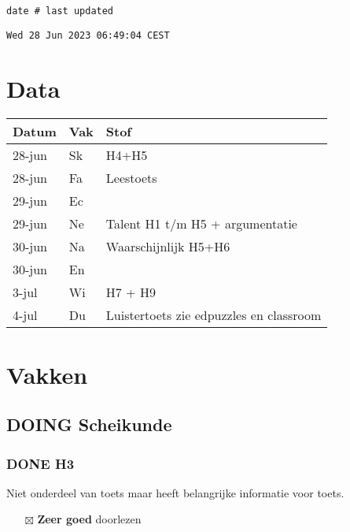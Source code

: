 \documentclass[11pt]{article}
\date{\today}
\title{}
\begin{document}
\setcounter{tocdepth}{3}
\tableofcontents

\begin{verbatim}
date # last updated
\end{verbatim}

\begin{verbatim}
Wed 28 Jun 2023 06:49:04 CEST
\end{verbatim}



\section{Data}
\label{sec:org7023549}
\begin{center}
\begin{tabular}{lll}
Datum & Vak & Stof\\[0pt]
\hline
28-jun & Sk & H4+H5\\[0pt]
28-jun & Fa & Leestoets\\[0pt]
29-jun & Ec & \\[0pt]
29-jun & Ne & Talent H1 t/m H5 + argumentatie\\[0pt]
30-jun & Na & Waarschijnlijk H5+H6\\[0pt]
30-jun & En & \\[0pt]
3-jul & Wi & H7 + H9\\[0pt]
4-jul & Du & Luistertoets zie edpuzzles en classroom\\[0pt]
\end{tabular}
\end{center}
\section{Vakken}
\label{sec:org7e2249c}
\subsection{{\bfseries\sffamily DOING} Scheikunde}
\label{sec:org003b3aa}
\subsubsection{{\bfseries\sffamily DONE} H3}
\label{sec:org4c9a67b}
Niet onderdeel van toets maar heeft belangrijke informatie voor toets.
\begin{itemize}
\item[{$\boxtimes$}] \textbf{Zeer goed} doorlezen
\end{itemize}
\end{document}
